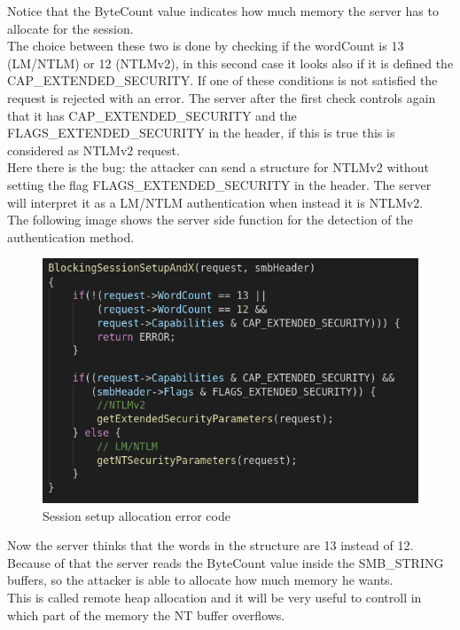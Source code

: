 \noindent Notice that the ByteCount value indicates how much memory the server has to allocate for the session.\\
\noindent The choice between these two is done by checking 
if the wordCount is 13 (LM/NTLM) or 12 (NTLMv2), in this second case it looks also if it is defined the 
CAP\_EXTENDED\_SECURITY. If one of these conditions is not satisfied the request is rejected with an error.
The server after the first check controls again that it has CAP\_EXTENDED\_SECURITY and the
FLAGS\_EXTENDED\_SECURITY in the header, if this is true this is considered as NTLMv2 request.\\
\noindent Here there is the bug: the attacker can send a structure for NTLMv2 without setting the flag FLAGS\_EXTENDED\_SECURITY in the 
header. The server will interpret it as a LM/NTLM authentication when instead it is NTLMv2.\\
The following image shows the server side function for the detection of the authentication method.

\begin{figure}[ht!]
  \centering
    \includegraphics[scale=0.35]{images/auth_vuln_code.png}
    \caption{Session setup allocation error code}
\end{figure}

\noindent Now the server thinks that the words in the structure are 13 instead of 12. Because of that the server reads the ByteCount value inside the 
SMB\_STRING buffers, so the attacker is able to allocate how much memory he wants. \\
This is called remote heap allocation and it will be very useful to controll in which part of the memory the NT buffer overflows.
